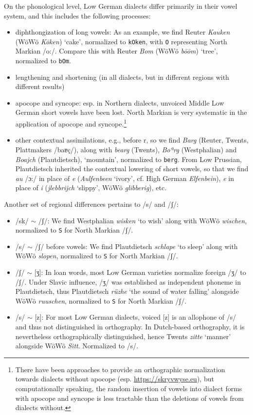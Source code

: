 \documentclass[11pt]{article}
\newcommand{\word}[1]{\textsl{#1}} %
\newcommand{\code}[1]{\texttt{#1}} %
\begin{document}
On the phonological level, Low German dialects differ primarily in their vowel system, and this includes the following processes:

\begin{itemize}
\item diphthongization of long vowels: As an example, we find Reuter \word{Kauken} (WöWö \word{Kōken}) `cake', normalized to \code{kOken}, with \code{O} representing North Markian /o:/. Compare this with Reuter \word{Bom} (WöWö \word{bōōm}) `tree', normalized to \code{bOm}.
\item lengthening and shortening (in all dialects, but in different regions with different results)
\item apocope and syncope: esp. in Northern dialects, unvoiced Middle Low German short vowels have been lost. North Markian is very systematic in the application of apocope and syncope.\footnote{
    There have been approaches to provide an orthographic normalization towards dialects without apocope (esp. \url{https://skryvwyse.eu}), but computationally speaking, the random insertion of vowels into dialect forms with apocope and syncope is less tractable than the deletions of vowels from dialects without.
}
\item other contextual assimilations, e.g., before r, so we find \word{Barg} (Reuter, Twents, Plattmakers 
/baɐç/), 
along with \word{bearg} (Twents), \word{Boªrg} (Westphalian) and \word{Boajch} (Plautdietsch),  `mountain', normalized to \code{berg}. From Low Prussian, Plautdietsch inherited the contextual lowering of short vowels, so that we find \word{au} /ɔ:/ in place of \word{e} (\word{Aulfenbeen} `ivory', cf. High German \word{Elfenbein}), \word{e} in place of \word{i} (\word{jlebbrijch} `slippy', WöWö \word{glibberig}), etc.
\end{itemize}

Another set of regional differences pertains to /s/ and /ʃ/:

\begin{itemize}
    \item /sk/ $\sim$ /ʃ/: We find Westphalian \word{wisken} `to wish' along with WöWö \word{wischen}, normalized to \code{S} for North Markian /ʃ/.
    \item /s/ $\sim$ /ʃ/ before vowels: We find Plautdietsch \word{schlape} `to sleep' along with WöWö \word{slopen}, normalized to \code{S} for North Markian /ʃ/.
    \item /ʃ/ $\sim$ [ʒ]: In loan words, most Low German varieties normalize foreign /ʒ/ to /ʃ/. Under Slavic influence, /ʒ/ was established as independent phoneme in Plautdietsch, thus Plautdietsch \word{rüzhe} `the sound of water falling' alongside WöWö \word{ruuschen}, normalized to \code{S} for North Markian /ʃ/.
    \item /s/ $\sim$ [z]: For most Low German dialects, voiced [z] is an allophone of /s/ and thus not distinguished in orthography. In Dutch-based orthography, it is nevertheless orthographically distinguished, hence Twents \word{zitte} `manner' alongside WöWö \word{Sitt}. Normalized to /s/.
\end{itemize}
\end{document}
